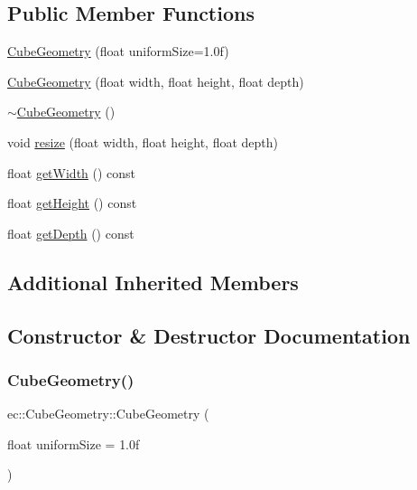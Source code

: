 \subsection*{Public Member Functions}
\begin{DoxyCompactItemize}
\item 
\mbox{\hyperlink{classec_1_1_cube_geometry_a539617a3a7e98e1a09af01e2328bac30}{Cube\+Geometry}} (float uniform\+Size=1.\+0f)
\item 
\mbox{\hyperlink{classec_1_1_cube_geometry_ac4ffe05d266c00e8e337233c4c48d29f}{Cube\+Geometry}} (float width, float height, float depth)
\item 
\mbox{\hyperlink{classec_1_1_cube_geometry_a8e8e46246b76cdf551d59d3f5c32d88d}{$\sim$\+Cube\+Geometry}} ()
\item 
void \mbox{\hyperlink{classec_1_1_cube_geometry_a627e0b292fee9b9c746c4ac221d167b6}{resize}} (float width, float height, float depth)
\item 
float \mbox{\hyperlink{classec_1_1_cube_geometry_ab164f9799b3590dc2f8328480094ca38}{get\+Width}} () const
\item 
float \mbox{\hyperlink{classec_1_1_cube_geometry_a43599cbf63a2c285a2b08c5eee7ad5b8}{get\+Height}} () const
\item 
float \mbox{\hyperlink{classec_1_1_cube_geometry_a15f5d4813e4ffa6d149d11ea711294d8}{get\+Depth}} () const
\end{DoxyCompactItemize}
\subsection*{Additional Inherited Members}


\subsection{Constructor \& Destructor Documentation}
\mbox{\label{classec_1_1_cube_geometry_a539617a3a7e98e1a09af01e2328bac30}} 
\subsubsection{\texorpdfstring{Cube\+Geometry()}{CubeGeometry()}\hspace{0.1cm}{\footnotesize\ttfamily [1/2]}}
{\footnotesize\ttfamily ec\+::\+Cube\+Geometry\+::\+Cube\+Geometry (\begin{DoxyParamCaption}\item[{float}]{uniform\+Size = {\ttfamily 1.0f} }\end{DoxyParamCaption})\hspace{0.3cm}{\ttfamily [explicit]}}

